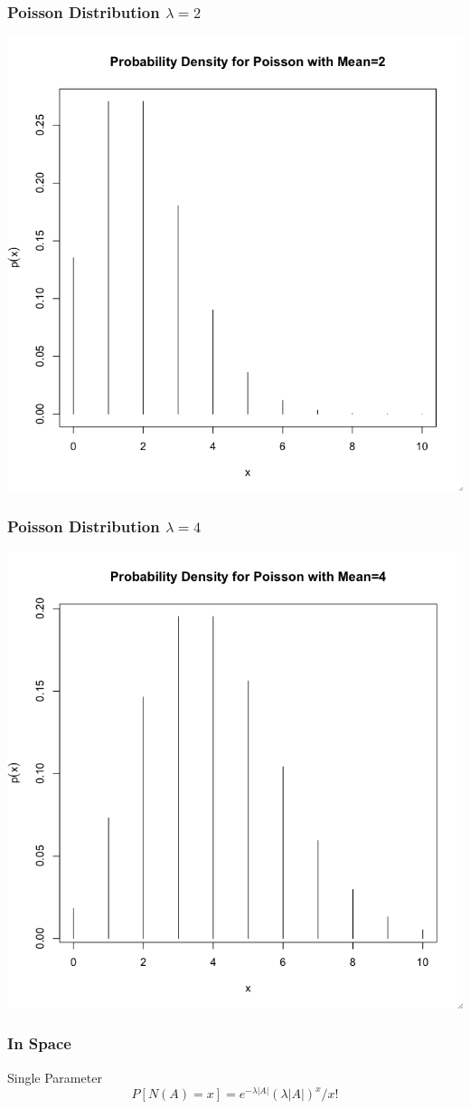 \documentclass[nototal,handout]{beamer}
\begin{document}
   \begin{frame}
     \frametitle{Poisson Distribution $\lambda=2$}
     \begin{center}
       \includegraphics[width=.65\linewidth]{poisson2pdf.png}
     \end{center}
   \end{frame}


   \begin{frame}
     \frametitle{Poisson Distribution $\lambda=4$}
     \begin{center}
       \includegraphics[width=.65\linewidth]{poisson4pdf.png}
     \end{center}
   \end{frame}

   \begin{frame}
     \frametitle{In Space}
     \begin{block}{Single Parameter}
      \begin{equation}
	P[N(A) = x ]= e^{-\lambda |A|} (\lambda |A|)^x /x!
      \end{equation}
      \end{block}
    \end{frame}
\end{document}
